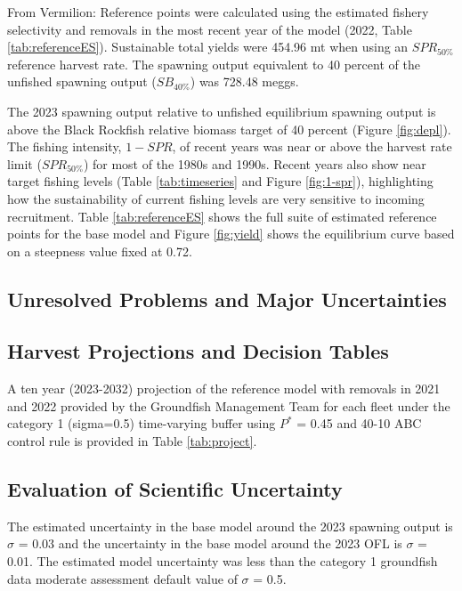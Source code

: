 \documentclass[11pt,
  english,
  letterpaper,
]{article}
\begin{document}
From Vermilion: Reference points were calculated using the estimated fishery selectivity and removals in the most recent year of the model (2022, Table \ref{tab:referenceES}). Sustainable total yields were 454.96 mt when using an \(SPR_{50\%}\) reference harvest rate. The spawning output equivalent to 40 percent of the unfished spawning output (\(SB_{40\%}\)) was 728.48 meggs.

The 2023 spawning output relative to unfished equilibrium spawning output is above the Black Rockfish relative biomass target of 40 percent (Figure \ref{fig:depl}). The fishing intensity, \(1-SPR\), of recent years was near or above the harvest rate limit (\(SPR_{50\%}\)) for most of the 1980s and 1990s. Recent years also show near target fishing levels (Table \ref{tab:timeseries} and Figure \ref{fig:1-spr}), highlighting how the sustainability of current fishing levels are very sensitive to incoming recruitment. Table \ref{tab:referenceES} shows the full suite of estimated reference points for the base model and Figure \ref{fig:yield} shows the equilibrium curve based on a steepness value fixed at 0.72.

\hypertarget{unresolved-problems-and-major-uncertainties-2}{%
\subsection{Unresolved Problems and Major Uncertainties}\label{unresolved-problems-and-major-uncertainties-2}}

\hypertarget{harvest-projections-and-decision-tables}{%
\subsection{Harvest Projections and Decision Tables}\label{harvest-projections-and-decision-tables}}

A ten year (2023-2032) projection of the reference model with removals in 2021 and 2022 provided by the Groundfish Management Team for each fleet under the category 1 (sigma=0.5) time-varying buffer using \(P^*\) = 0.45 and 40-10 ABC control rule is provided in Table \ref{tab:project}.

\hypertarget{evaluation-of-scientific-uncertainty}{%
\subsection{Evaluation of Scientific Uncertainty}\label{evaluation-of-scientific-uncertainty}}

The estimated uncertainty in the base model around the 2023 spawning output is \(\sigma\) = 0.03 and the uncertainty in the base model around the 2023 OFL is \(\sigma\) = 0.01. The estimated model uncertainty was less than the category 1 groundfish data moderate assessment default value of \(\sigma\) = 0.5.
\end{document}
